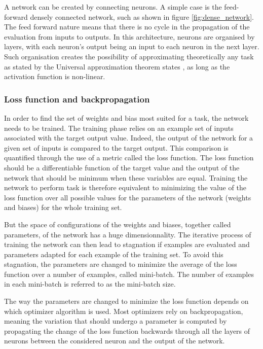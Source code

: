 A network can be created by connecting neurons. A simple case is the feed-forward densely connected network, such as shown in figure \ref{fig:dense_network}. The feed forward nature means that there is no cycle in the propagation of the evaluation from inputs to outputs. In this architecture, neurons are organised by layers, with each neuron's output being an input to each neuron in the next layer. Such organisation creates the possibility of approximating theoretically any task as stated by the Universal approximation theorem states \cite{Cybenko1989}, as long as the activation function is non-linear.

\subsubsection{Loss function and backpropagation}

In order to find the set of weights and bias most suited for a task, the network needs to be trained.
The training phase relies on an example set of inputs associated with the target output value. Indeed, the output of the network for a given set of inputs is compared to the target output. This comparison is quantified through the use of a metric called the loss function. The loss function should be a differentiable function of the target value and the output of the network that should be minimum when these variables are equal. Training the network to perform task is therefore equivalent to minimizing the value of the loss function over all possible values for the parameters of the network (weights and biases) for the whole training set.

But the space of configurations of the weights and biases, together called parameters, of the network has a huge dimensionnality. The iterative process of training the network can then lead to stagnation if examples are evaluated and parameters adapted for each example of the training set. To avoid this stagnation, the parameters are changed to minimize the average of the loss function over a number of examples, called mini-batch. The number of examples in each mini-batch is referred to as the mini-batch size.

The way the parameters are changed to minimize the loss function depends on which optimizer algorithm is used. Most optimizers rely on backpropagation, meaning the variation that should undergo a parameter is computed by propagating the change of the loss function backwards through all the layers of neurons between the considered neuron and the output of the network. 


